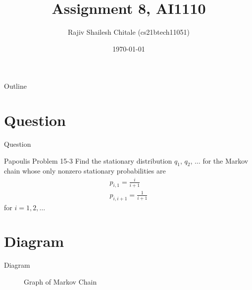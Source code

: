\documentclass{beamer}
\begin{document}
\let\StandardTheFigure\thefigure
\let\vec\mathbf

\def\putbox#1#2#3{\makebox[0in][l]{\makebox[#1][l]{}\raisebox{\baselineskip}[0in][0in]{\raisebox{#2}[0in][0in]{#3}}}}
     \def\rightbox#1{\makebox[0in][r]{#1}}
     \def\centbox#1{\makebox[0in]{#1}}
     \def\topbox#1{\raisebox{-\baselineskip}[0in][0in]{#1}}
     \def\midbox#1{\raisebox{-0.5\baselineskip}[0in][0in]{#1}}
\vspace{3cm}


\title{Assignment 8, AI1110} 
\author{Rajiv Shailesh Chitale (cs21btech11051)}
\date{\today}
\logo{\large \LaTeX{}}
\begin{frame}
    \titlepage 
\end{frame}

\logo{}

\begin{frame}{Outline}
    \tableofcontents
\end{frame}
\section{Question}
\begin{frame}{Question}
    \begin{block}{ Papoulis Problem 15-3}
    Find the stationary distribution $q_1$, $q_2$, $\dots$ for the Markov chain whose only nonzero stationary probabilities are
    \begin{align}
        p_{i,1} = \frac{i}{i+1} \\
        p_{i,i+1} = \frac{1}{i+1} 
        \label{eq:nextProbability}
    \end{align}
    for $i = 1, 2, \dots$
    \end{block} 
\end{frame}
\section{Diagram}
\begin{frame}{Diagram}
\begin{figure}[!ht]
        \centering
        \begin{tikzpicture}[->, >= stealth, shorten >=2pt , line width =0.5 pt ,
            node distance =2 cm]
              
        \end{tikzpicture}
        \caption{Graph of Markov Chain}
        \label{fig: markov_chain}
    \end{figure}
\end{frame}
\end{document}
